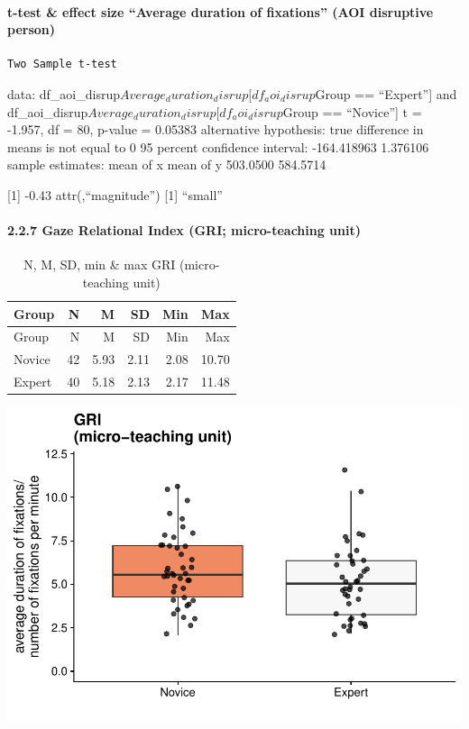 \documentclass[
]{article}
\begin{document}
\paragraph{t-test \& effect size ``Average duration of fixations'' (AOI
disruptive
person)}\label{t-test-effect-size-average-duration-of-fixations-aoi-disruptive-person}

\begin{verbatim}
Two Sample t-test
\end{verbatim}

data: df\_aoi\_disrup\(Average_duration_disrup[df_aoi_disrup\)Group ==
``Expert''{]} and
df\_aoi\_disrup\(Average_duration_disrup[df_aoi_disrup\)Group ==
``Novice''{]} t = -1.957, df = 80, p-value = 0.05383 alternative
hypothesis: true difference in means is not equal to 0 95 percent
confidence interval: -164.418963 1.376106 sample estimates: mean of x
mean of y 503.0500 584.5714

{[}1{]} -0.43 attr(,``magnitude'') {[}1{]} ``small''

\paragraph{2.2.7 Gaze Relational Index (GRI; micro-teaching
unit)}\label{gaze-relational-index-gri-micro-teaching-unit}

\begin{longtable}[]{@{}lrrrrr@{}}
\caption{N, M, SD, min \& max GRI (micro-teaching unit)}\tabularnewline
\toprule\noalign{}
Group & N & M & SD & Min & Max \\
\midrule\noalign{}
\endfirsthead
\toprule\noalign{}
Group & N & M & SD & Min & Max \\
\midrule\noalign{}
\endhead
\bottomrule\noalign{}
\endlastfoot
Novice & 42 & 5.93 & 2.11 & 2.08 & 10.70 \\
Expert & 40 & 5.18 & 2.13 & 2.17 & 11.48 \\
\end{longtable}

\includegraphics{expertise_2024_09_26_no_outlierdetection_MK_files/figure-latex/gri_all-1.pdf}
\end{document}

